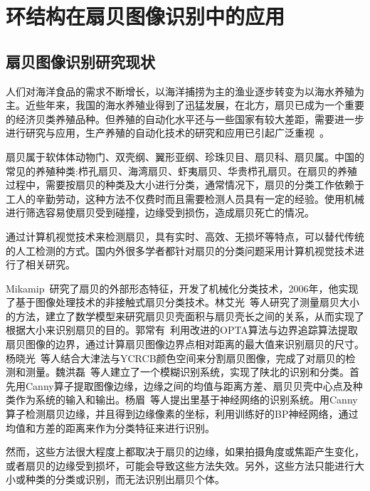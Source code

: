 

\chapter{环结构在扇贝图像识别中的应用}
\label{cha:intro}

\renewcommand\arraystretch{1}

\section{扇贝图像识别研究现状}
\label{}

人们对海洋食品的需求不断增长，以海洋捕捞为主的渔业逐步转变为以海水养殖为主。近些年来，我国的海水养殖业得到了迅猛发展，在北方，扇贝已成为一个重要的经济贝类养殖品种。但养殖的自动化水平还与一些国家有较大差距，需要进一步进行研究与应用，生产养殖的自动化技术的研究和应用已引起广泛重视~\cite{zhucongrong}。

扇贝属于软体体动物门、双壳纲、翼形亚纲、珍珠贝目、扇贝科、扇贝属。中国的常见的养殖种类:栉孔扇贝、海湾扇贝、虾夷扇贝、华贵栉孔扇贝。在扇贝的养殖过程中，需要按扇贝的种类及大小进行分类，通常情况下，扇贝的分类工作依赖于工人的辛勤劳动，这种方法不仅费时而且需要检测人员具有一定的经验。使用机械进行筛选容易使扇贝受到碰撞，边缘受到损伤，造成扇贝死亡的情况。

通过计算机视觉技术来检测扇贝，具有实时、高效、无损坏等特点，可以替代传统的人工检测的方式。国内外很多学者都针对扇贝的分类问题采用计算机视觉技术进行了相关研究。

Mikamip~\cite{mikamip}研究了扇贝的外部形态特征，开发了机械化分类技术，2006年，他实现了基于图像处理技术的非接触式扇贝分类技术。林艾光~\cite{linaiguang}等人研究了测量扇贝大小的方法，建立了数学模型来研究扇贝贝壳面积与扇贝壳长之间的关系，从而实现了根据大小来识别扇贝的目的。郭常有~\cite{guochangyou}利用改进的OPTA算法与边界追踪算法提取扇贝图像的边界，通过计算扇贝图像边界点相对距离的最大值来识别扇贝的尺寸。杨晓光~\cite{yangxiaoguang}等人结合大津法与YCRCB颜色空间来分割扇贝图像，完成了对扇贝的检测和测量。魏洪磊~\cite{weihonglei}等人建立了一个模糊识别系统，实现了陕北的识别和分类。首先用Canny算子提取图像边缘，边缘之间的均值与距离方差、扇贝贝壳中心点及种类作为系统的输入和输出。杨眉~\cite{yangmei}等人提出里基于神经网络的识别系统。用Canny算子检测扇贝边缘，并且得到边缘像素的坐标，利用训练好的BP神经网络，通过均值和方差的距离来作为分类特征来进行识别。

然而，这些方法很大程度上都取决于扇贝的边缘，如果拍摄角度或焦距产生变化，或者扇贝的边缘受到损坏，可能会导致这些方法失效。另外，这些方法只能进行大小或种类的分类或识别，而无法识别出扇贝个体。

